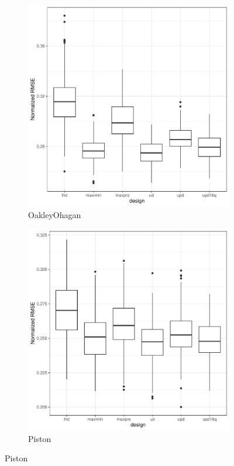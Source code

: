 \documentclass [PhD] {package/uclathes}
\begin{document}
\begin{figure}
\begin{adjustwidth}{-2cm}{-2cm}
\begin{subfigure}[b]{0.35\textwidth}
\end{subfigure}
\begin{subfigure}[b]{0.35\textwidth}
\centering
\caption{OakleyOhagan}
\includegraphics[width=\textwidth]{chapters/EGO/pdfs/OakleyOhagan_128x31}
\end{subfigure}
\begin{subfigure}[b]{0.35\textwidth}
\centering
\caption{Piston}
\includegraphics[width=\textwidth]{chapters/EGO/pdfs/Piston_128x31}

\end{subfigure}
\end{adjustwidth}
\end{figure}
\end{document}
